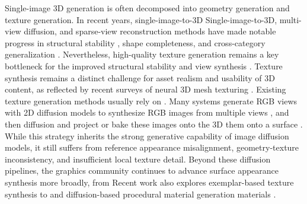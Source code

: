 \documentclass[times,twocolumn,final]{elsarticle}
\providecommand{\DIFadd}[1]{{\protect\color{blue} \sf #1}} %
\providecommand{\DIFdel}[1]{{\protect\color{red} \scriptsize #1}} %
\providecommand{\DIFaddbegin}{} %
\providecommand{\DIFaddend}{} %
\providecommand{\DIFdelbegin}{} %
\providecommand{\DIFdelend}{} %
\begin{document}
Single-image 3D generation is often decomposed into geometry generation and texture generation. \DIFdelbegin \DIFdel{In recent years, single-image-to-3D}\DIFdelend \DIFaddbegin \DIFadd{Single-image-to-3D}\DIFaddend , multi-view diffusion, and sparse-view reconstruction methods have \DIFdelbegin \DIFdel{made notable progress in structural stability , shape completeness, and cross-category generalization \cite{liu2023zero1to3,shi2023zero123pp,liu2023syncdreamer,long2023wonder3d,shi2024mvdream,wang2023imagedream,xu2024instantmesh,ke2024era3d}. Nevertheless, high-quality texture generation remains a key bottleneck for the }\DIFdelend \DIFaddbegin \DIFadd{improved structural stability and view synthesis \cite{liu2023zero1to3,shi2023zero123pp,liu2023syncdreamer,long2023wonder3d,shi2024mvdream,wang2023imagedream,xu2024instantmesh,ke2024era3d}. Texture synthesis remains a distinct challenge for asset }\DIFaddend realism and usability \DIFdelbegin \DIFdel{of 3D content, as reflected by recent surveys of neural 3D mesh texturing \cite{perla2026survey}. Existing texture generation methods usually rely on }\DIFdelend \DIFaddbegin \DIFadd{\cite{perla2026survey}. Many systems generate RGB views with }\DIFaddend 2D \DIFdelbegin \DIFdel{diffusion models to synthesize RGB images from multiple views , and then }\DIFdelend \DIFaddbegin \DIFadd{diffusion and }\DIFaddend project or bake \DIFdelbegin \DIFdel{these images onto the 3D }\DIFdelend \DIFaddbegin \DIFadd{them onto a }\DIFaddend surface \cite{chen2023text2tex,richardson2023texture,poole2023dreamfusion,chen2023fantasia3d}. \DIFdelbegin \DIFdel{While this strategy inherits the strong generative capability of image diffusion models, it still suffers from reference appearance misalignment, geometry-texture inconsistency, and insufficient local texture detail. Beyond these diffusion pipelines, the graphics community continues to advance surface appearance synthesis more broadly, from }\DIFdelend \DIFaddbegin \DIFadd{Recent work also explores }\DIFaddend exemplar-based texture synthesis \DIFdelbegin \DIFdel{\cite{guzman2026adaptive} to }\DIFdelend \DIFaddbegin \DIFadd{and }\DIFaddend diffusion-based procedural \DIFdelbegin \DIFdel{material generation \cite{lv2025interpretable}}\DIFdelend \DIFaddbegin \DIFadd{materials \cite{guzman2026adaptive,lv2025interpretable}}\DIFaddend .
\end{document}
